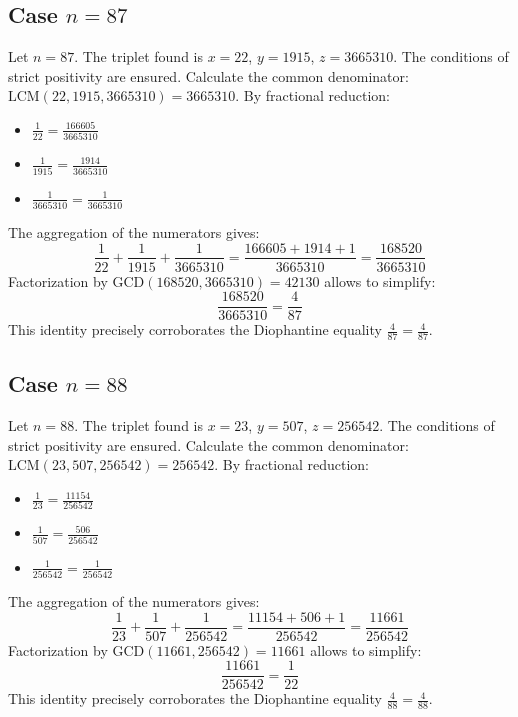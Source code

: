 \documentclass[11pt,a4paper]{article}
\begin{document}
\subsection{Case $n = 87$}
Let $n = 87$. The triplet found is $x = 22$, $y = 1915$, $z = 3665310$.
The conditions of strict positivity are ensured.
Calculate the common denominator: $\text{LCM}(22, 1915, 3665310) = 3665310$.
By fractional reduction:
\begin{itemize}
    \item $\frac{1}{22} = \frac{166605}{3665310}$
    \item $\frac{1}{1915} = \frac{1914}{3665310}$
    \item $\frac{1}{3665310} = \frac{1}{3665310}$
\end{itemize}
The aggregation of the numerators gives:
$$ \frac{1}{22} + \frac{1}{1915} + \frac{1}{3665310} = \frac{166605 + 1914 + 1}{3665310} = \frac{168520}{3665310} $$
Factorization by $\text{GCD}(168520, 3665310) = 42130$ allows to simplify:
$$ \frac{168520}{3665310} = \frac{4}{87} $$
This identity precisely corroborates the Diophantine equality $\frac{4}{87} = \frac{4}{87}$.

\subsection{Case $n = 88$}
Let $n = 88$. The triplet found is $x = 23$, $y = 507$, $z = 256542$.
The conditions of strict positivity are ensured.
Calculate the common denominator: $\text{LCM}(23, 507, 256542) = 256542$.
By fractional reduction:
\begin{itemize}
    \item $\frac{1}{23} = \frac{11154}{256542}$
    \item $\frac{1}{507} = \frac{506}{256542}$
    \item $\frac{1}{256542} = \frac{1}{256542}$
\end{itemize}
The aggregation of the numerators gives:
$$ \frac{1}{23} + \frac{1}{507} + \frac{1}{256542} = \frac{11154 + 506 + 1}{256542} = \frac{11661}{256542} $$
Factorization by $\text{GCD}(11661, 256542) = 11661$ allows to simplify:
$$ \frac{11661}{256542} = \frac{1}{22} $$
This identity precisely corroborates the Diophantine equality $\frac{4}{88} = \frac{4}{88}$.
\end{document}

